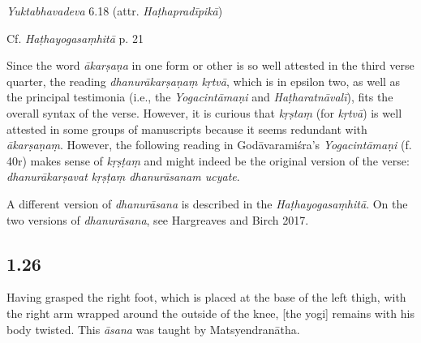 \begin{ekdosis}
\begin{testimonia}[hp01_025]
\emph{Yuktabhavadeva} 6.18 (attr. \emph{Haṭhapradīpikā})

\begin{versinnote}
\end{versinnote}

Cf. \emph{Haṭhayogasaṃhitā} p. 21

\begin{versinnote}
\end{versinnote}

\end{testimonia}

\begin{philcomm}[hp01_025]
Since the word \emph{ākarṣaṇa} in one form or other is so well attested in the third verse quarter, the reading \emph{dhanurākarṣaṇaṃ kṛtvā}, which is in epsilon two, as well as the principal testimonia (i.e., the \emph{Yogacintāmaṇi} and \emph{Haṭharatnāvalī}), fits the overall syntax of the verse. However, it is curious that \emph{kṛṣtaṃ} (for \emph{kṛtvā}) is well attested in some groups of manuscripts because it seems redundant with \emph{ākarṣaṇaṃ}. However, the following reading in 
Godāvaramiśra's \emph{Yogacintāmaṇi} (f. 40r) makes sense of \emph{kṛṣṭaṃ} and might indeed be the original version of the verse: \emph{dhanurākarṣavat kṛṣṭaṃ dhanurāsanam ucyate}.

A different version of \emph{dhanurāsana} is described in the \emph{Haṭhayogasaṃhitā}. On the two versions of \emph{dhanurāsana}, see Hargreaves and Birch 2017.
\end{philcomm}

\subsection*{1.26}
\begin{translation}[hp01_026]
Having grasped the right foot, which is placed at the base of the left thigh, with the right arm wrapped around the outside of the knee, [the yogi] remains with his body twisted. This \emph{āsana} was taught by Matsyendranātha.
\end{translation}


\end{ekdosis}
